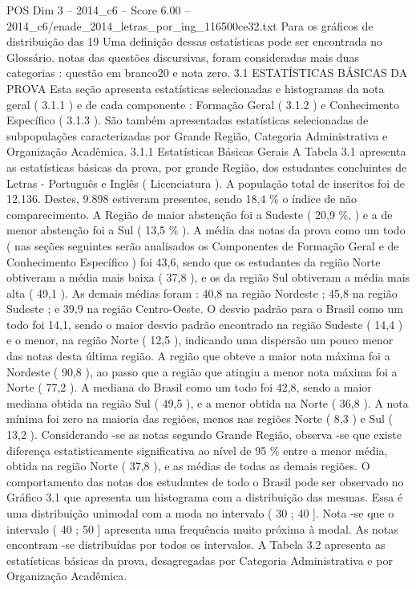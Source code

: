 \begin{textsample}{POS Dim 3 – 2014\_c6 – Score 6.00 – 2014\_c6/enade\_2014\_letras\_por\_ing\_116500ce32.txt}
Para os gráficos de distribuição das 19 Uma definição dessas estatísticas pode ser encontrada no Glossário. notas das questões discursivas, foram consideradas mais duas categorias : questão em branco20 e nota zero. 3.1 ESTATÍSTICAS BÁSICAS DA PROVA Esta seção apresenta estatísticas selecionadas e histogramas da nota geral ( 3.1.1 ) e de cada componente : Formação Geral ( 3.1.2 ) e Conhecimento Específico ( 3.1.3 ).
São também apresentadas estatísticas selecionadas de subpopulações caracterizadas por Grande Região, Categoria Administrativa e Organização Acadêmica. 3.1.1 Estatísticas Básicas Gerais A Tabela 3.1 apresenta as estatísticas básicas da prova, por grande Região, dos estudantes concluintes de Letras - Português e Inglês ( Licenciatura ).
A população total de inscritos foi de 12.136.
Destes, 9.898 estiveram presentes, sendo 18,4 \% o índice de não comparecimento.
A Região de maior abstenção foi a Sudeste ( 20,9 \%, ) e a de menor abstenção foi a Sul ( 13,5 \% ).
A média das notas da prova como um todo ( nas seções seguintes serão analisados os Componentes de Formação Geral e de Conhecimento Específico ) foi 43,6, sendo que os estudantes da região Norte obtiveram a média mais baixa ( 37,8 ), e os da região Sul obtiveram a média mais alta ( 49,1 ).
As demais médias foram : 40,8 na região Nordeste ; 45,8 na região Sudeste ; e 39,9 na região Centro-Oeste.
O desvio padrão para o Brasil como um todo foi 14,1, sendo o maior desvio padrão encontrado na região Sudeste ( 14,4 ) e o menor, na região Norte ( 12,5 ), indicando uma dispersão um pouco menor das notas desta última região.
A região que obteve a maior nota máxima foi a Nordeste ( 90,8 ), ao passo que a região que atingiu a menor nota máxima foi a Norte ( 77,2 ).
A mediana do Brasil como um todo foi 42,8, sendo a maior mediana obtida na região Sul ( 49,5 ), e a menor obtida na Norte ( 36,8 ).
A nota mínima foi zero na maioria das regiões, menos nas regiões Norte ( 8,3 ) e Sul ( 13,2 ).
Considerando -se as notas segundo Grande Região, observa -se que existe diferença estatisticamente significativa ao nível de 95 \% entre a menor média, obtida na região Norte ( 37,8 ), e as médias de todas as demais regiões.
O comportamento das notas dos estudantes de todo o Brasil pode ser observado no Gráfico 3.1 que apresenta um histograma com a distribuição das mesmas.
Essa é uma distribuição unimodal com a moda no intervalo ( 30 ; 40 ].
Nota -se que o intervalo ( 40 ; 50 ] apresenta uma frequência muito próxima à modal.
As notas encontram -se distribuídas por todos os intervalos.
A Tabela 3.2 apresenta as estatísticas básicas da prova, desagregadas por Categoria Administrativa e por Organização Acadêmica.

\end{textsample}
